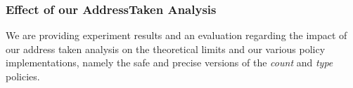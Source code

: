 \begin{table}[h!]
		\caption {The results of comparing \textit{type} safe and precision implementation throughout different optimizations.}
		\label{tbl:policycomptype}
\end{table}

\newpage


\subsubsection{Effect of our AddressTaken Analysis}
\label{subsection:effectivenessaddresstaken}
We are providing experiment results and an evaluation regarding the impact of our address taken analysis on the theoretical limits and our various policy implementations, 
namely the safe and precise versions of the \textit{count} and \textit{type} policies.

